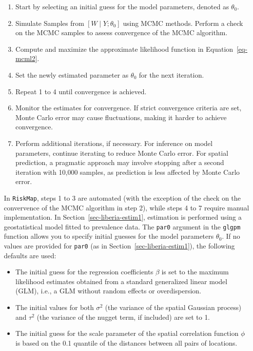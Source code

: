 \documentclass[
  letterpaper,
]{krantz}
\providecommand{\tightlist}{%
  \setlength{\itemsep}{0pt}\setlength{\parskip}{0pt}}
\begin{document}
\begin{enumerate}
\def\labelenumi{\arabic{enumi}.}
\item
  Start by selecting an initial guess for the model parameters, denoted
  as \(\theta_0\).
\item
  Simulate Samples from \([W \mid Y; \theta_0]\) using MCMC methods.
  Perform a check on the MCMC samples to assess convergence of the MCMC
  algorithm.
\item
  Compute and maximize the approximate likelihood function in
  Equation~\ref{eq-mcml2}.
\item
  Set the newly estimated parameter as \(\theta_0\) for the next
  iteration.
\item
  Repeat 1 to 4 until convergence is achieved.
\item
  Monitor the estimates for convergence. If strict convergence criteria
  are set, Monte Carlo error may cause fluctuations, making it harder to
  achieve convergence.
\item
  Perform additional iterations, if necessary. For inference on model
  parameters, continue iterating to reduce Monte Carlo error. For
  spatial prediction, a pragmatic approach may involve stopping after a
  second iteration with 10,000 samples, as prediction is less affected
  by Monte Carlo error.
\end{enumerate}

In \texttt{RiskMap}, steps 1 to 3 are automated (with the exception of
the check on the convervence of the MCMC algorithm in step 2), while
steps 4 to 7 require manual implementation. In
Section~\ref{sec-liberia-estim1}, estimation is performed using a
geostatistical model fitted to prevalence data. The \texttt{par0}
argument in the \texttt{glgpm} function allows you to specify initial
guesses for the model parameters \(\theta_0\). If no values are provided
for \texttt{par0} (as in Section~\ref{sec-liberia-estim1}), the
following defaults are used:

\begin{itemize}
\tightlist
\item
  The initial guess for the regression coefficients \(\beta\) is set to
  the maximum likelihood estimates obtained from a standard generalized
  linear model (GLM), i.e., a GLM without random effects or
  overdispersion.
\item
  The initial values for both \(\sigma^2\) (the variance of the spatial
  Gaussian process) and \(\tau^2\) (the variance of the nugget term, if
  included) are set to 1.
\item
  The initial guess for the scale parameter of the spatial correlation
  function \(\phi\) is based on the 0.1 quantile of the distances
  between all pairs of locations.
\end{itemize}
\end{document}

